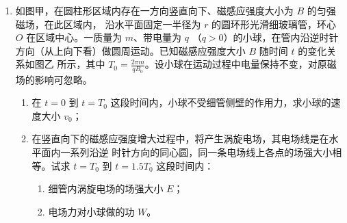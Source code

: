 \begin{enumerate}
\item 
{}
如图甲，在圆柱形区域内存在一方向竖直向下、磁感应强度大小为 $ B $ 的匀强磁场，在此区域内，
沿水平面固定一半径为 $ r $ 的圆环形光滑细玻璃管，环心 $ O $ 在区域中心。一质量为 $ m $、带电量为 $ q $
（$ q>0 $）的小球，在管内沿逆时针方向（从上向下看）做圆周运动。已知磁感应强度大小 $ B $ 随时间
$ t $ 的变化关系如图乙
所示，其中
$T_{0}=\frac{2 \pi m}{q B_{0}}$。设小球在运动过程中电量保持不变，对原磁场的影响可忽略。
\begin{enumerate}
\item
在 $ t=0 $ 到 $ t=T_{0} $ 这段时间内，小球不受细管侧壁的作用力，求小球的速度大小 $ v_{0} $；
\item 
在竖直向下的磁感应强度增大过程中，将产生涡旋电场，其电场线是在水平面内一系列沿逆
时针方向的同心圆，同一条电场线上各点的场强大小相等。试求 $ t=T_{0} $ 到 $ t=1.5 T_{0} $ 这段时间内：
\begin{enumerate}
\item
细管内涡旋电场的场强大小 $ E $；
\item 
电场力对小球做的功 $ W $。
\end{enumerate}

\end{enumerate}
\begin{figure}[h!]
\flushright
\begin{subfigure}{0.4\linewidth}
\centering
 
\caption{}\label{}
\end{subfigure}
\begin{subfigure}{0.4\linewidth}
\centering
 
\caption{}\label{}
\end{subfigure}
\end{figure}



\end{enumerate}
